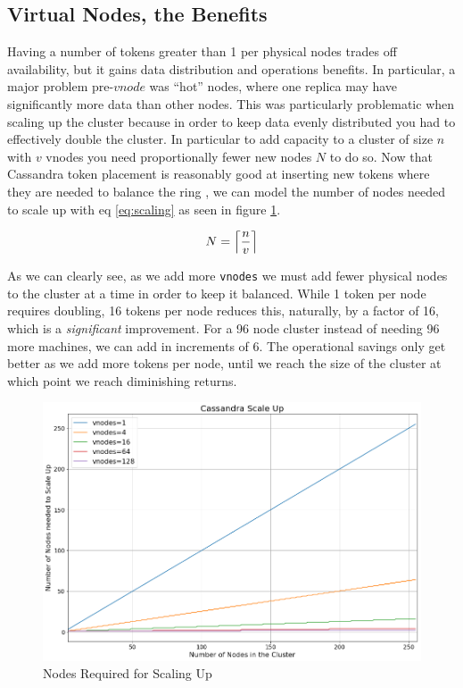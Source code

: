 \documentclass{article}
\DeclarePairedDelimiter{\ceil}{\lceil}{\rceil}
\begin{document}
\subsection{Virtual Nodes, the Benefits}

Having a number of tokens greater than 1 per physical nodes trades off
availability, but it gains data distribution and operations benefits. In
particular, a major problem pre-$vnode$ was ``hot'' nodes, where one replica
may have significantly more data than other nodes. This was particularly
problematic when scaling up the cluster because in order to keep data evenly
distributed you had to effectively double the cluster. In particular to add
capacity to a cluster of size $n$ with $v$ vnodes you need proportionally fewer
new nodes $N$ to do so. Now that Cassandra token placement is reasonably good
at inserting new tokens where they are needed to balance the ring
\cite{tokenallocation}, we can model the number of nodes needed to scale up
with eq \ref{eq:scaling} as seen in figure \ref{fig:scaling}.

\begin{equation} \label{eq:scaling}
    N = \ceil*{\frac{n}{v}}
\end{equation}

As we can clearly see, as we add more \texttt{vnodes} we must add fewer
physical nodes to the cluster at a time in order to keep it balanced. While 1
token per node requires doubling, 16 tokens per node reduces this, naturally,
by a factor of 16, which is a \textit{significant} improvement. For a 96 node
cluster instead of needing 96 more machines, we can add in increments of 6. The
operational savings only get better as we add more tokens per node, until we
reach the size of the cluster at which point we reach diminishing returns.

\begin{figure}[H]
    \centering
    \includegraphics[width=1.0\textwidth]{images/scale_up.png}
    \caption{Nodes Required for Scaling Up}
    \label{fig:scaling}
\end{figure}
\end{document}
